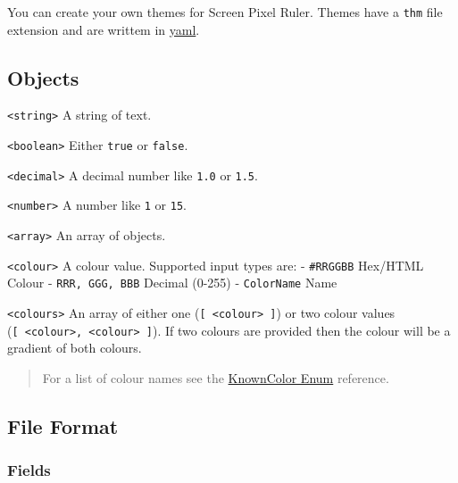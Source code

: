 \documentclass[
]{book}
\begin{document}
You can create your own themes for Screen Pixel Ruler.
Themes have a \texttt{thm} file extension and are writtem in \href{https://yaml.org}{yaml}.

\hypertarget{objects}{%
\subsection{Objects}\label{objects}}

\texttt{\textless{}string\textgreater{}} A string of text.

\texttt{\textless{}boolean\textgreater{}} Either \texttt{true} or \texttt{false}.

\texttt{\textless{}decimal\textgreater{}} A decimal number like \texttt{1.0} or \texttt{1.5}.

\texttt{\textless{}number\textgreater{}} A number like \texttt{1} or \texttt{15}.

\texttt{\textless{}array\textgreater{}} An array of objects.

\texttt{\textless{}colour\textgreater{}} A colour value.
Supported input types are:
- \texttt{\textquotesingle{}\#RRGGBB\textquotesingle{}} Hex/HTML Colour
- \texttt{RRR,\ GGG,\ BBB} Decimal (0-255)
- \texttt{ColorName} Name

\texttt{\textless{}colours\textgreater{}} An array of either one (\texttt{{[}\ \textless{}colour\textgreater{}\ {]}}) or two colour values (\texttt{{[}\ \textless{}colour\textgreater{},\ \textless{}colour\textgreater{}\ {]}}).
If two colours are provided then the colour will be a gradient of both colours.

\begin{quote}
For a list of colour names see the \href{https://docs.microsoft.com/en-us/dotnet/api/system.drawing.knowncolor?view=netcore-3.1}{KnownColor Enum} reference.
\end{quote}

\hypertarget{file-format}{%
\subsection{File Format}\label{file-format}}

\hypertarget{fields}{%
\subsubsection{Fields}\label{fields}}
\end{document}
